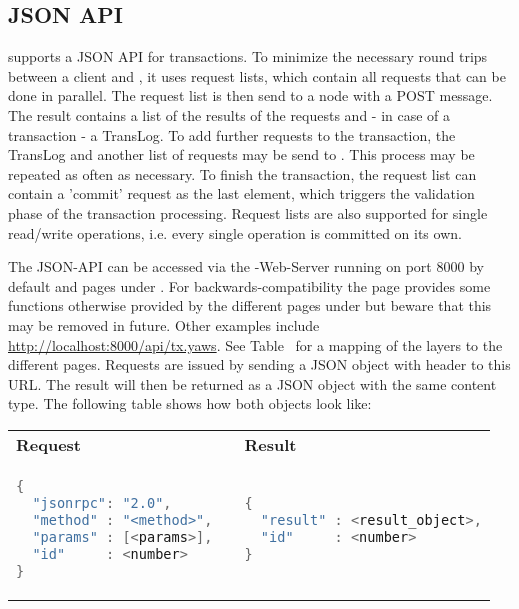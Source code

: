 \subsection{JSON API}
\label{sec.api.json}

\scalaris{} supports a JSON API for transactions. To minimize the necessary
round trips between a client and \scalaris{}, it uses request lists, which
contain all requests that can be done in parallel. The request list is then
send to a \scalaris{} node with a POST message. The result contains
a list of the results of the requests and - in case of a transaction - a
TransLog. To add further
requests to the transaction, the TransLog and another list of requests may
be send to \scalaris{}. This process may be repeated as often as necessary.
To finish the transaction, the request list can contain a 'commit' request
as the last element, which triggers the validation phase of the transaction
processing.
Request lists are also supported for single read/write operations, i.e.
every single operation is committed on its own.

The JSON-API can be accessed via the \scalaris{}-Web-Server running on port
8000 by default and pages under .
For backwards-compatibility the page  provides some
functions otherwise provided by the different pages under  but
beware that this may be removed in future.
Other examples include \url{http://localhost:8000/api/tx.yaws}.
See Table~ for a mapping of the layers to the
different pages.
Requests are issued by sending a JSON object with header
 to this URL.
The result will then be returned as a JSON object with the same content type.
The following table shows how both objects look like:

\begin{tabular}{p{}cp{}}
\bf Request & & \bf Result \\
\begin{lstlisting}[language=java]
{
  "jsonrpc": "2.0",
  "method" : "<method>",
  "params" : [<params>],
  "id"     : <number>
}
\end{lstlisting}
& &
\begin{lstlisting}[language=java]
{
  "result" : <result_object>,
  "id"     : <number>
}
\end{lstlisting}
\end{tabular}


